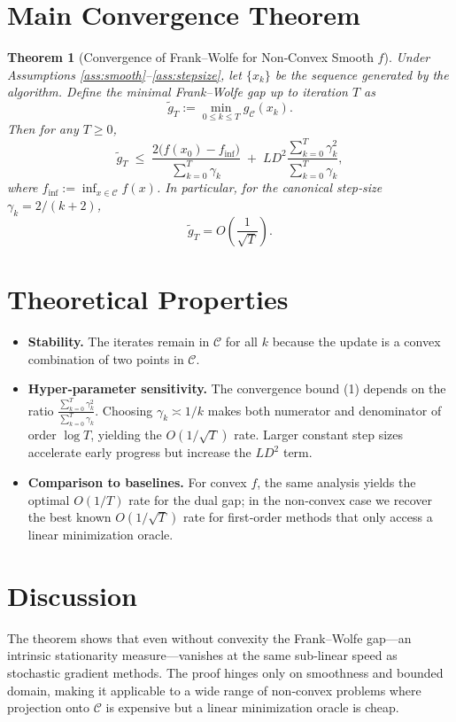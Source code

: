 \documentclass{article}
\newtheorem{theorem}{Theorem}
\begin{document}
\section*{Main Convergence Theorem}
\begin{theorem}[Convergence of Frank–Wolfe for Non‑Convex Smooth $f$]\label{thm:main}
Under Assumptions \ref{ass:smooth}–\ref{ass:stepsize}, let $\{x_k\}$ be the sequence generated by the algorithm. Define the minimal Frank–Wolfe gap up to iteration $T$ as
\[
\tilde g_T := \min_{0\le k\le T} g_{\mathcal C}(x_k).
\]
Then for any $T\ge 0$,
\[
\tilde g_T \;\le\; \frac{2\bigl(f(x_0)-f_{\inf}\bigr)}{\sum_{k=0}^{T}\gamma_k}
               \;+\; L D^2 \frac{\sum_{k=0}^{T}\gamma_k^2}{\sum_{k=0}^{T}\gamma_k},
\tag{1}
\]
where $f_{\inf}:=\inf_{x\in\mathcal C}f(x)$. In particular, for the canonical step‑size $\gamma_k=2/(k+2)$,
\[
\tilde g_T = O\!\left(\frac{1}{\sqrt{T}}\right).
\]
\end{theorem}

\section*{Theoretical Properties}
\begin{itemize}
\item \textbf{Stability.} The iterates remain in $\mathcal C$ for all $k$ because the update is a convex combination of two points in $\mathcal C$.
\item \textbf{Hyper‑parameter sensitivity.} The convergence bound (1) depends on the ratio
\(\displaystyle\frac{\sum_{k=0}^{T}\gamma_k^2}{\sum_{k=0}^{T}\gamma_k}\).
Choosing $\gamma_k\asymp 1/k$ makes both numerator and denominator of order $\log T$, yielding the $O(1/\sqrt{T})$ rate. Larger constant step sizes accelerate early progress but increase the $L D^2$ term.
\item \textbf{Comparison to baselines.} For convex $f$, the same analysis yields the optimal $O(1/T)$ rate for the dual gap; in the non‑convex case we recover the best known $O(1/\sqrt{T})$ rate for first‑order methods that only access a linear minimization oracle.
\end{itemize}

\section*{Discussion}
The theorem shows that even without convexity the Frank–Wolfe gap—an intrinsic stationarity measure—vanishes at the same sub‑linear speed as stochastic gradient methods. The proof hinges only on smoothness and bounded domain, making it applicable to a wide range of non‑convex problems where projection onto $\mathcal C$ is expensive but a linear minimization oracle is cheap.
\end{document}
